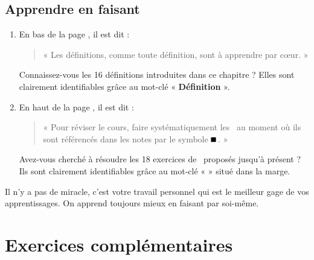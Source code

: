 \subsection{Apprendre en faisant}
	\begin{enumerate}
	\item En bas de la page \pageref{parcoeur}, il est dit :
	\begin{quote}
	« Les définitions, comme toute définition, sont à apprendre par c\oe ur. »
	\end{quote}
	Connaissez-vous les 16 définitions introduites dans ce chapitre ?
	Elles sont clairement identifiables grâce au mot-clé 
	« {\bf Définition} ».
	
	\item En haut de la page \pageref{appropriation}, il est dit :
	\begin{quote}
	« Pour réviser le cours, faire systématiquement les \tdir\ au moment où ils sont
	référencés dans les notes par le symbole {\color{blue}$\rule{2mm}{2mm}\,$}. »
	\end{quote}
	Avez-vous cherché à résoudre les 18 exercices de \tdir\ proposés jusqu'à présent ?
	Ils sont clairement identifiables grâce au mot-clé « {\color{blue}\bf \tdir} » situé dans
	la marge.
	\end{enumerate}
	Il n'y a pas de miracle, c'est votre travail personnel qui est le meilleur 
	gage de vos apprentissages. On apprend toujours mieux en faisant par soi-même.

\newpage
\setlength{\textwidth}{25cm}
\setlength{\textheight}{16cm}
\setlength{\marginparwidth}{0cm}
\setlength{\marginparsep}{0cm}
\setlength{\linewidth}{25cm}
\setlength{\oddsidemargin}{0cm}
\setlength{\evensidemargin}{0cm}
\setlength{\topmargin}{-0.75cm}

\section{Exercices complémentaires}

